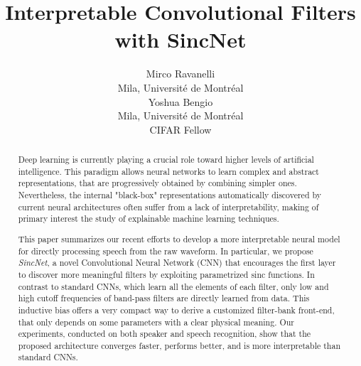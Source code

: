 \documentclass{article}
\title{Interpretable Convolutional Filters with SincNet}
\author{
  Mirco Ravanelli\\
  Mila, Universit\'e de Montr\'eal \\
\And
  Yoshua Bengio \\
  Mila, Universit\'e de Montr\'eal \\
  CIFAR Fellow
}
\begin{document}
\maketitle

\begin{abstract}
Deep learning is currently playing a crucial role toward higher levels of artificial intelligence.
This paradigm allows neural networks to learn complex and abstract representations, that are progressively obtained by combining simpler ones.
Nevertheless, the internal "black-box" representations automatically discovered by current neural architectures often suffer from a lack of interpretability, making of primary interest the study of explainable machine learning techniques.

This paper summarizes our recent efforts to develop a more interpretable neural model for directly processing speech from the raw waveform. In particular, we propose \textit{SincNet}, a novel Convolutional Neural Network (CNN) that encourages the first layer to discover more meaningful filters by exploiting parametrized sinc functions. In contrast to standard CNNs, which learn all the elements of each filter, only low and high cutoff frequencies of band-pass filters are directly learned from data. This inductive bias offers a very compact way to derive a customized filter-bank front-end, that only depends on some parameters with a clear physical meaning. 
Our experiments, conducted on both speaker and speech recognition, show that the proposed architecture converges faster, performs better, and is more interpretable than standard CNNs.

\end{abstract}
\end{document}
